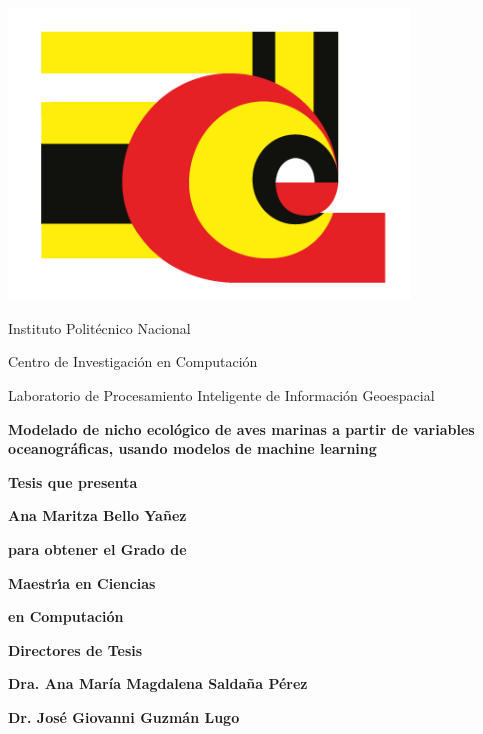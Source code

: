 \begin{minipage}{0.18\textwidth}
	\includegraphics[width=0.8\textwidth]{imagen/logo-cic.png}
\end{minipage}%
\begin{minipage}{0.82\textwidth}
\begin{center}
	\large \sc Instituto Politécnico Nacional
\end{center}
\end{minipage}

\vspace{0.5cm}
\centerline{\Large Centro de Investigación en Computación}
\vspace{0.5cm}
\centerline{\Large Laboratorio de Procesamiento Inteligente de Información Geoespacial}

\begin{center}
\Large \bf
Modelado de nicho ecológico de aves marinas a partir de variables oceanográficas, usando modelos de machine learning
\end{center}

\centerline{\Large \bf Tesis que presenta}
\vspace{0.5cm}
\centerline{\Large \bf Ana Maritza Bello Yañez}
\vspace{0.5cm}
\centerline{\Large \bf para obtener el Grado de}
\vspace{0.5cm}
\centerline{\Large \bf Maestr\'\i a en Ciencias}
\vspace{0.5cm}
\centerline{\Large \bf en Computaci\'on}
\vspace{0.5cm}
\centerline{\Large \bf }
\vspace{1.2cm}
\centerline{\Large \bf Directores de Tesis}
\vspace{0.5cm}
\centerline{\Large \bf Dra. Ana María Magdalena Saldaña Pérez }
\centerline{\Large \bf Dr. José Giovanni Guzmán Lugo }
 
